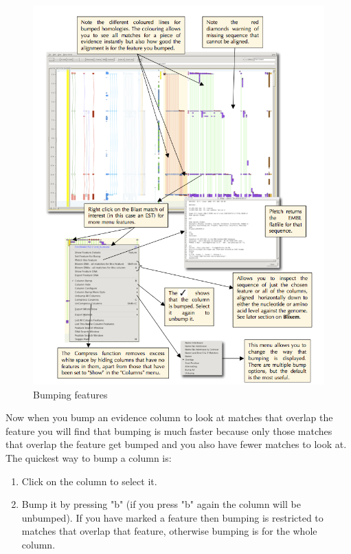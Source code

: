 \documentclass[letterpaper]{article}
\begin{document}
\begin{figure}
\centering
\color[rgb]{0.30980393,0.5058824,0.7411765}
\includegraphics[width=15.231cm]{img_bumping.png}
\caption{Bumping features}
\label{img_bumping}
\end{figure}

Now when you bump an evidence column to look at matches that overlap the feature you will find that bumping is much faster because only those matches that overlap the feature get bumped and you also have fewer matches to look at. The quickest way to bump a column is:
\begin{enumerate}
\item Click on the column to select it.
\item Bump it by pressing "b" (if you press "b" again the column will be unbumped). If you have marked a feature then bumping is restricted to matches that overlap that feature, otherwise bumping is for the whole column.
\end{enumerate}
\end{document}

